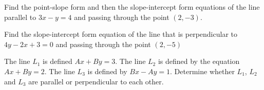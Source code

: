 \newpage



\begin{exercise}
	Find the point-slope form and then the slope-intercept form equations of the line parallel to $3x-y=4$ and passing through the point $(2,-3)$.
\end{exercise}

\vfill\hfill
\begin{center}
\end{center}

\begin{exercise}
	Find the slope-intercept form equation of the line that is perpendicular to $4y-2x+3=0$ and passing through the point $(2, -5)$
\end{exercise}

\vfill\hfill
\begin{center}
\end{center}

\begin{exercise}
	The line $L_1$ is defined $Ax+By=3$. The line $L_2$ is defined by the equation $Ax+By=2$. The line $L_3$ is defined by $Bx-Ay=1$. Determine whether $L_1$, $L_2$ and $L_3$ are parallel or perpendicular to each other.
\end{exercise}

\vfill\hfill
\begin{center}
\end{center}

\newpage 

